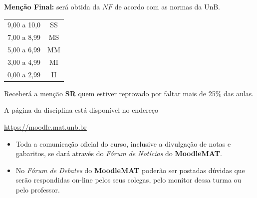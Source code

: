 \documentclass[12pt]{exam}
\begin{document}
\vspace{0.5cm}
{\bf \noindent Menção Final:} será obtida da $NF$ de acordo com as normas da UnB.
\begin{center}
    \begin{tabular}{c|c}
        \hline\hline
        \hspace{1cm}{Nota}\hspace{1cm} & \hspace{0.25cm}{Menção}\hspace{0.25cm}\\
        \hline\hline
        9,00 a 10,0 & SS \\
        \hline
        7,00 a 8,99 & MS \\
        \hline
        5,00 a 6,99 & MM \\
        \hline
        3,00 a 4,99 & MI \\
        \hline
        0,00 a 2,99  & II \\
        \hline\hline
    \end{tabular}
\end{center}
Receberá a menção {\bf SR} quem estiver reprovado por faltar mais de 25\% das aulas.

\vspace{0.5cm}
 A página da disciplina está disponível no endereço
\begin{center}
    \href{https://moodle.mat.unb.br/course/view.php?id=55}{https://moodle.mat.unb.br}
\end{center}

\begin{itemize}
\item Toda a comunicação oficial do curso, inclusive a divulgação de
notas e gabaritos, se dará através do {\em Fórum de Notícias} do
\textbf{MoodleMAT}.
\item No {\em Fórum de Debates} do \textbf{MoodleMAT} poderão ser
postadas dúvidas que serão respondidas on-line pelos seus
colegas, pelo monitor dessa turma ou pelo professor.
\end{itemize}

\end{document}
